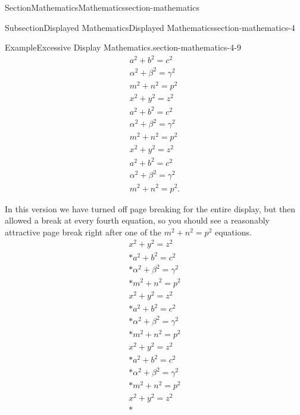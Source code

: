 \documentclass[twoside,10pt,]{article}
\numberwithin{equation}{section}
\begin{document}
\begin{sectionptx}{Section}{Mathematics}{}{Mathematics}{}{}{section-mathematics}
\begin{subsectionptx}{Subsection}{Displayed Mathematics}{}{Displayed Mathematics}{}{}{section-mathematics-4}
\begin{example}{Example}{Excessive Display Mathematics.}{section-mathematics-4-9}
\begin{gather}
a^2+b^2=c^2\label{section-mathematics-4-9-2-2-38}\\
\alpha^2+\beta^2=\gamma^2\label{section-mathematics-4-9-2-2-39}\\
m^2+n^2=p^2\label{section-mathematics-4-9-2-2-40}\\
x^2+y^2=z^2\label{section-mathematics-4-9-2-2-41}\\
a^2+b^2=c^2\label{section-mathematics-4-9-2-2-42}\\
\alpha^2+\beta^2=\gamma^2\label{section-mathematics-4-9-2-2-43}\\
m^2+n^2=p^2\label{section-mathematics-4-9-2-2-44}\\
x^2+y^2=z^2\label{section-mathematics-4-9-2-2-45}\\
a^2+b^2=c^2\label{section-mathematics-4-9-2-2-46}\\
\alpha^2+\beta^2=\gamma^2\label{section-mathematics-4-9-2-2-47}\\
m^2+n^2=p^2\text{.}\label{section-mathematics-4-9-2-2-48}
\end{gather}
%
\par
In this version we have turned off page breaking for the entire display, but then allowed a break at every fourth equation, so you should see a reasonably attractive page break right after one of the \(m^2+n^2=p^2\) equations.%
\begin{gather}
x^2+y^2=z^2\label{section-mathematics-4-9-3-2-1}\\*
a^2+b^2=c^2\label{section-mathematics-4-9-3-2-2}\\*
\alpha^2+\beta^2=\gamma^2\label{section-mathematics-4-9-3-2-3}\\*
m^2+n^2=p^2\label{section-mathematics-4-9-3-2-4}\\
x^2+y^2=z^2\label{section-mathematics-4-9-3-2-5}\\*
a^2+b^2=c^2\label{section-mathematics-4-9-3-2-6}\\*
\alpha^2+\beta^2=\gamma^2\label{section-mathematics-4-9-3-2-7}\\*
m^2+n^2=p^2\label{section-mathematics-4-9-3-2-8}\\
x^2+y^2=z^2\label{section-mathematics-4-9-3-2-9}\\*
a^2+b^2=c^2\label{section-mathematics-4-9-3-2-10}\\*
\alpha^2+\beta^2=\gamma^2\label{section-mathematics-4-9-3-2-11}\\*
m^2+n^2=p^2\label{section-mathematics-4-9-3-2-12}\\
x^2+y^2=z^2\label{section-mathematics-4-9-3-2-13}\\*

\end{gather}
\end{example}
\end{subsectionptx}
\end{sectionptx}
\end{document}
